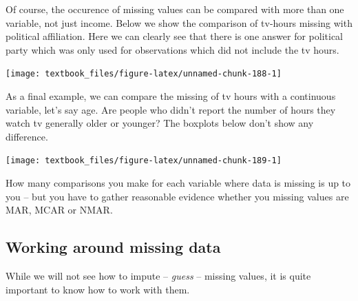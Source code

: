 \documentclass[]{tufte-book}
\newenvironment{Shaded}{}{}
\newcommand{\DataTypeTok}[1]{\textcolor[rgb]{0.56,0.13,0.00}{#1}}
\newcommand{\KeywordTok}[1]{\textcolor[rgb]{0.00,0.44,0.13}{\textbf{#1}}}
\newcommand{\NormalTok}[1]{#1}
\newcommand{\OperatorTok}[1]{\textcolor[rgb]{0.40,0.40,0.40}{#1}}
\newcommand{\StringTok}[1]{\textcolor[rgb]{0.25,0.44,0.63}{#1}}
\begin{document}
Of course, the occurence of missing values can be compared with more than one variable, not just income. Below we show the comparison of tv-hours missing with political affiliation. Here we can clearly see that there is one answer for political party which was only used for observations which did not include the tv hours.

\begin{Shaded}
\end{Shaded}

\texttt{[image: textbook\_files/figure-latex/unnamed-chunk-188-1]}

As a final example, we can compare the missing of tv hours with a continuous variable, let's say age. Are people who didn't report the number of hours they watch tv generally older or younger? The boxplots below don't show any difference.

\begin{Shaded}
\end{Shaded}

\texttt{[image: textbook\_files/figure-latex/unnamed-chunk-189-1]}

How many comparisons you make for each variable where data is missing is up to you -- but you have to gather reasonable evidence whether you missing values are MAR, MCAR or NMAR.

\hypertarget{working-around-missing-data}{%
\subsection{Working around missing data}\label{working-around-missing-data}}

While we will not see how to impute -- \emph{guess} -- missing values, it is quite important to know how to work with them.
\end{document}
